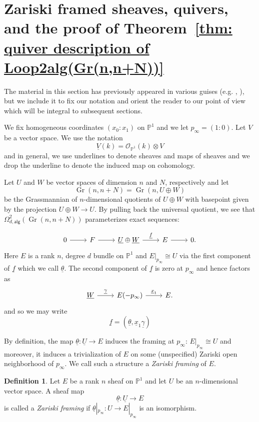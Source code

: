 \message{ !name(Bryan-Vakil.tex)}\documentclass{amsart}
\theoremstyle{definition}
\newtheorem{definition}[theorem]{Definition}
\newcommand{\PP}{\mathbb{P}}
\newcommand{\OO}{\mathcal{O}}
\newcommand{\UL}[1]{\underline{#1}}
\newcommand{\alg}{\mathsf{alg}}
\newcommand{\Gr}{\operatorname{Gr}}
\newcommand{\LoopTwo}{\Omega^{2}_{d,\alg}}
\begin{document}
\section{Zariski framed sheaves, quivers, and the proof of
Theorem~\ref{thm: quiver description of
Loop2alg(Gr(n,n+N))}}\label{sec: Zariski framed sheaves, quivers, and
proof of Loop2(Gr) theorem}


The material in this section has previously appeared in various guises
(e.g. \cite[\S~5]{Larson-Vakil-BottPeriodicity},
\cite[\S~3]{Nakajima-Handsaw}), but we include it to fix our notation
and orient the reader to our point of view which will be integral to
subsequent sections.



We fix homogeneous coordinates $(x_{0}:x_{1})$ on $\PP^{1}$ and we let
$p_{\infty }=(1:0)$. Let $V$ be a vector space. We use the notation
\[
\UL{V}(k) = \OO_{\PP^{1}}(k)\otimes V
\]
and in general, we use underlines to denote sheaves and maps of
sheaves and we drop the underline to denote the induced map on cohomology.


Let $U$ and $W$ be vector spaces of dimension $n$ and $N$, respectively
and let
\[
\Gr (n,n+N) = \Gr (n,U\oplus W)
\]
be the Grassmannian of $n$-dimensional quotients of $U\oplus W$ with
basepoint given by the projection $U\oplus W\to U$. By pulling back
the universal quotient, we see that $\LoopTwo (\Gr (n,n+N))$
parameterizes exact sequences:

\[
\begin{tikzcd}
0\arrow[r]& F \arrow[r]& \UL{U}\oplus \UL{W} \arrow{r}{\UL{f} } &E
\arrow[r]& 0.
\end{tikzcd}
\]
Here $E$ is a rank $n$, degree $d$ bundle on $\PP^{1}$ and
$E|_{p_{\infty}}\cong U$ via the first component of $\UL{f}$ which we
call $\UL{\theta}$. The second component of $\UL{f}$ is zero at
$p_{\infty}$ and hence factors as
\[
\begin{tikzcd}
 \UL{W} \arrow[r,"\UL{\gamma }"]& E(-p_{\infty})
 \arrow[r,"\UL{x}_{1}"] &E. 
\end{tikzcd}
\]
and so we may write
\[
\UL{f}
=({\UL{\theta}},\UL{x}_{1}\UL{\gamma })
\]

By definition, the map $\UL{\theta}:\UL{U}\to E$ induces the framing
at $p_{\infty}$: $E|_{p_{\infty}}\cong U$ and moreover, it induces a
trivialization of $E$ on some (unspecified) Zariski open neighborhood
of $p_{\infty}$. We call such a structure a \emph{Zariski framing} of $E$.

\begin{definition}\label{defn: Zariski framing}
Let $E$ be a rank $n$ sheaf on $\PP^{1}$ and let $U$ be an
$n$-dimensional vector space. A sheaf map 
\[
\UL{\theta}: \UL{U}\to E
\]
is called a \emph{Zariski framing} if $\UL{\theta}|_{p_{\infty}}:U \to
E|_{p_{\infty}}$ is an isomorphism.
\end{definition}
\end{document}
